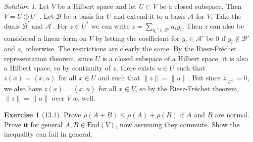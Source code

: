 \documentclass[reqno]{amsart}
\theoremstyle{definition}
\newtheorem{exercise}[theorem]{Exercise}
\theoremstyle{remark}
\newtheorem*{solution}{Solution}
\newcommand{\End}{{\mathrm{End}}}
\begin{document}
    \begin{solution}
        Let $V$ be a Hilbert space and let
        $U \subset V$ be a closed subspace. Then
        $V = U \oplus U^{\perp}$. Let
        $\mathcal{B}$ be a basis for
        $U$ and extend it to a basis 
        $\mathcal{A}$ for $V$. Take the duals
        $\mathcal{B}^{'}$ and $\mathcal{A}^{'}$.
        For $z \in U^{*}$ we can write
        $z = \sum_{y_i' \in \mathcal{B}'}
        a_i y_i$. Then $z$ can also be considered a linear
        form on $V$ by letting the coefficient for
        $y_i \in \mathcal{A}'$ be $0$ if
        $y_i \not\in \mathcal{B}'$ and
        $a_i$ otherwise. The restrictions are clearly
        the same. 
        By the Riesz-Fréchet representation theorem,
        since $U$ is a closed subspace of a Hilbert space, it
        is also a Hilbert space, so by continuity of $z$, there
        exists $u \in U$ such that
        $z(x) = \left< x,u \right>$ for all $x \in U$ and
        such that $\|z\| = \|u\|$.
        But since  $z|_{U^{\perp}} = 0$, we also
        have $z(x) = \left< x,u \right>$ for all $x \in V$, so
        by the Riesz-Fréchet theorem, $\|z\| = \|u\|$ over $V$ as well.


    \end{solution}


    \begin{exercise}[13.1]
        Prove $\rho (A+B) \le \rho (A) + \rho(B)$ if
        $A$ and $B$ are normal. Prove it for general
        $A,B \in \End (V)$, now assuming they commute.
        Show the inequality can fail in general.
    \end{exercise}
\end{document}
